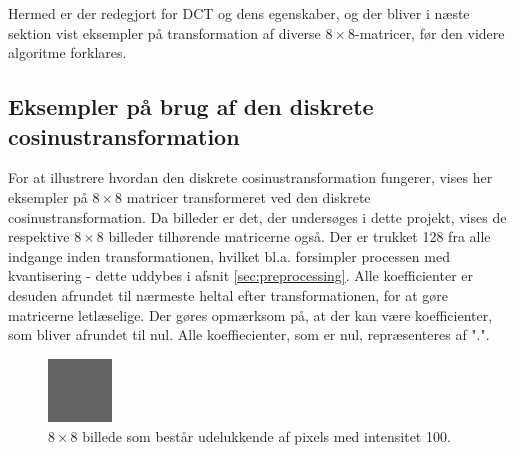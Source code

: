 Hermed er der redegjort for DCT og dens egenskaber, og der bliver i næste sektion vist eksempler på transformation af diverse $8\times8$-matricer, før den videre algoritme forklares.
\subsection{Eksempler på brug af den diskrete cosinustransformation}
For at illustrere hvordan den diskrete cosinustransformation fungerer, vises her eksempler på $8\times8$ matricer transformeret ved den diskrete cosinustransformation. Da billeder er det, der undersøges i dette projekt, vises de respektive $8\times8$ billeder tilhørende matricerne også. Der er trukket 128 fra alle indgange inden transformationen, hvilket bl.a. forsimpler processen med kvantisering - dette uddybes i afsnit \ref{sec:preprocessing}. Alle koefficienter er desuden afrundet til nærmeste heltal efter transformationen, for at gøre matricerne letlæselige. Der gøres opmærksom på, at der kan være koefficienter, som bliver afrundet til nul. Alle koeffiecienter, som er nul, repræsenteres af ".".
\begin{figure}[htbp]
\centering
\includegraphics[width=0.15\textwidth]{Billeder/8x8_eks1.png}
\caption{$8 \times 8$ billede som består udelukkende af pixels med intensitet 100.\label{fig:8x8graa}}
\end{figure}

